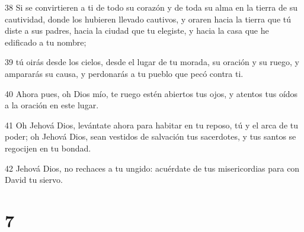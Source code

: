 \par 38 Si se convirtieren a ti de todo su corazón y de toda su alma en la tierra de su cautividad, donde los hubieren llevado cautivos, y oraren hacia la tierra que tú diste a sus padres, hacia la ciudad que tu elegiste, y hacia la casa que he edificado a tu nombre;
\par 39 tú oirás desde los cielos, desde el lugar de tu morada, su oración y su ruego, y ampararás su causa, y perdonarás a tu pueblo que pecó contra ti.
\par 40 Ahora pues, oh Dios mío, te ruego estén abiertos tus ojos, y atentos tus oídos a la oración en este lugar.
\par 41 Oh Jehová Dios, levántate ahora para habitar en tu reposo, tú y el arca de tu poder; oh Jehová Dios, sean vestidos de salvación tus sacerdotes, y tus santos se regocijen en tu bondad.
\par 42 Jehová Dios, no rechaces a tu ungido: acuérdate de tus misericordias para con David tu siervo. 

\chapter{7}


